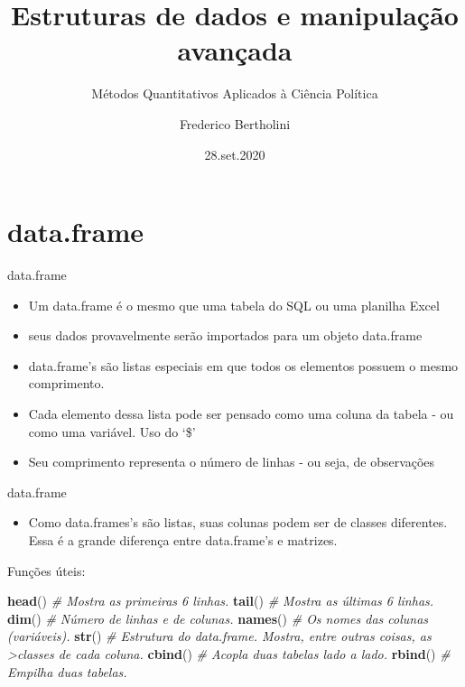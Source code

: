 \documentclass[
  10pt,
  ignorenonframetext,
]{beamer}
\title{Estruturas de dados e manipulação avançada}
\subtitle{Métodos Quantitativos Aplicados à Ciência Política}
\author{Frederico Bertholini}
\date{28.set.2020}
\newenvironment{Shaded}{\begin{snugshade}}{\end{snugshade}}
\newcommand{\CommentTok}[1]{\textcolor[rgb]{0.56,0.35,0.01}{\textit{#1}}}
\newcommand{\KeywordTok}[1]{\textcolor[rgb]{0.13,0.29,0.53}{\textbf{#1}}}
\newcommand{\NormalTok}[1]{#1}
\providecommand{\tightlist}{%
  \setlength{\itemsep}{0pt}\setlength{\parskip}{0pt}}
\begin{document}
\frame{\titlepage}

\begin{frame}[allowframebreaks]
  \tableofcontents[hideallsubsections]
\end{frame}
\hypertarget{data.frame}{%
\section{data.frame}\label{data.frame}}

\begin{frame}{data.frame}
\protect\hypertarget{data.frame-1}{}
\begin{itemize}
\item
  Um data.frame é o mesmo que uma tabela do SQL ou uma planilha Excel
\item
  seus dados provavelmente serão importados para um objeto data.frame
\item
  data.frame's são listas especiais em que todos os elementos possuem o
  mesmo comprimento.
\item
  Cada elemento dessa lista pode ser pensado como uma coluna da tabela -
  ou como uma variável. Uso do `\$'
\item
  Seu comprimento representa o número de linhas - ou seja, de
  observações
\end{itemize}
\end{frame}

\begin{frame}[fragile]{data.frame}
\protect\hypertarget{data.frame-2}{}
\begin{itemize}
\tightlist
\item
  Como data.frames's são listas, suas colunas podem ser de classes
  diferentes. Essa é a grande diferença entre data.frame's e matrizes.
\end{itemize}

Funções úteis:

\begin{Shaded}
\begin{Highlighting}[]
\KeywordTok{head}\NormalTok{() }\CommentTok{\# Mostra as primeiras 6 linhas.}
\KeywordTok{tail}\NormalTok{() }\CommentTok{\# Mostra as últimas 6 linhas.}
\KeywordTok{dim}\NormalTok{() }\CommentTok{\# Número de linhas e de colunas.}
\KeywordTok{names}\NormalTok{() }\CommentTok{\# Os nomes das colunas (variáveis).}
\KeywordTok{str}\NormalTok{() }\CommentTok{\# Estrutura do data.frame. Mostra, entre outras coisas, as \textgreater{}classes de cada coluna.}
\KeywordTok{cbind}\NormalTok{() }\CommentTok{\# Acopla duas tabelas lado a lado.}
\KeywordTok{rbind}\NormalTok{() }\CommentTok{\# Empilha duas tabelas.}
\end{Highlighting}
\end{Shaded}
\end{frame}
\end{document}
